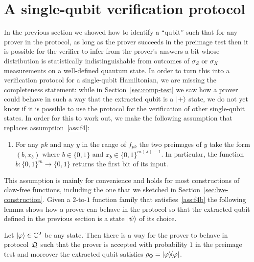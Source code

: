 \section{A single-qubit verification protocol}

In the previous section we showed how to identify a ``qubit'' such that for any prover in the protocol, as long as the prover succeeds in the preimage test then it is possible for the verifier to infer from the prover's answers a bit whose distribution is statistically indistinguishable from outcomes of $\sigma_Z$ or $\sigma_X$ measurements on a well-defined quantum state. In order to turn this into a verification protocol for a single-qubit Hamiltonian, we are missing the completeness statement: while in Section~\ref{sec:comp-test} we saw how a prover could behave in such a way that the extracted qubit is a $|+\rangle$ state, we do not yet know if it is possible to use the protocol for the verification of other single-qubit states. In order for this to work out, we make the following assumption that replaces assumption~\ref{ass:f4}:
\begin{enumerate}[label=(\textbf{F.4'})]
\item\label{ass:f4b} For any $pk$ and any $y$ in the range of $f_{pk}$ the two preimages of $y$ take the form $(b,x_b)$ where $b\in\{0,1\}$ and $x_b \in \{0,1\}^{m(\lambda)-1}$. In particular, the function $b:\{0,1\}^m \to \{0,1\}$ returns the first bit of its input. 
\end{enumerate}
This assumption is mainly for convenience and holds for most constructions of claw-free functions, including the one that we sketched in Section~\ref{sec:lwe-construction}. Given a $2$-to-$1$ function family that satisfies~\ref{ass:f4b} the following lemma shows how a prover can behave in the protocol so that the extracted qubit defined in the previous section is a state $|\psi\rangle$ of its choice. 

\begin{lemma}\label{lem:oq-completeness}
Let $|\varphi\rangle\in\mathbb{C}^2$ be any state. Then there is a way for the prover to behave in protocol~$\mathfrak{Q}$ such that the prover is accepted with probability $1$ in the preimage test and moreover the extracted qubit satisfies $\rho_{\textsf{Q}} = |\varphi\rangle\!\langle\varphi|$. 
\end{lemma}

